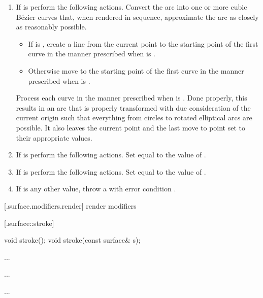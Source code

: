 \begin{enumerate}
\begin{enumerate}
	\item
	If  is  perform the following actions. Convert the arc into one or more cubic B\'ezier curves that, when rendered in sequence, approximate the arc as closely as reasonably possible.
	\begin{itemize}
		\item
		If  is , create a line from the current point to the starting point of the first curve in the manner prescribed when  is .
		
		\item
		Otherwise move to the starting point of the first curve in the manner prescribed when  is .
	\end{itemize}
	Process each curve in the manner prescribed when  is . \enternote Done properly, this results in an arc that is properly transformed with due consideration of the current origin such that everything from circles to rotated elliptical arcs are possible. It also leaves the current point and the last move to point set to their appropriate values. \exitnote
	
	\item
	If  is  perform the following actions. Set  equal to the value of .
	
	\item
	If  is  perform the following actions. Set  equal to the value of .
	
	\item
	If  is any other value, throw a  with error condition .
	\end{enumerate}
	\end{enumerate}

 [\iotwod.surface.modifiers.render] { render modifiers}

 [\iotwod.surface::stroke] {}

%
%
\begin{itemdecl}
void stroke();
void stroke(const surface& s);
\end{itemdecl}
\begin{itemdescr}
	\pnum
	\effects
	...
	
	\pnum
	\postconditions
	...
	
	\pnum
	\complexity
	...
	
\end{itemdescr}

